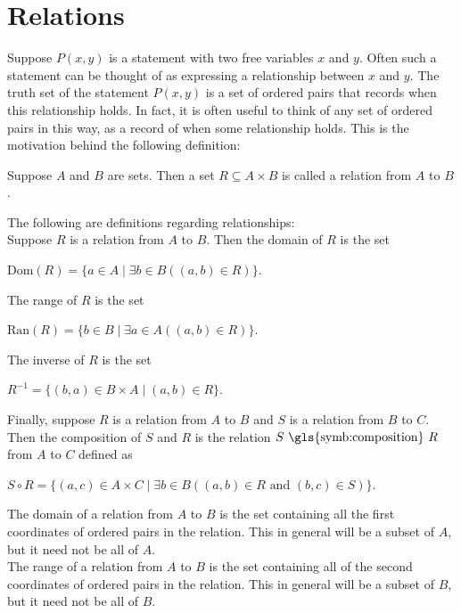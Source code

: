 \documentclass{article}
\begin{document}
\section{Relations}
Suppose $P(x, y)$ is a statement with two free variables $x$ and $y$. Often such a statement can be thought of as expressing a \gls{relationship} between $x$ and $y$. The truth set of the statement $P(x, y)$ is a set of ordered pairs that records when this relationship holds. In fact, it is often useful to think of any set of ordered pairs in this way, as a record of when some relationship holds. This is the motivation behind the following definition:
\begin{center}
    Suppose $A$ and $B$ are sets. Then a set $R \subseteq A \times B$ is called a \gls{relation} from $A$ to $B$.
\end{center}
The following are definitions regarding relationships:\\
Suppose $R$ is a relation from $A$ to $B$. Then the \gls{domain} of $R$ is the set
\begin{center}
    $\text{Dom}(R) = \{a \in A \mid \exists b \in B((a,b) \in R)\}$.
\end{center}
The \gls{range} of $R$ is the set
\begin{center}
    $\text{Ran}(R) = \{b \in B \mid \exists a \in A((a,b) \in R)\}$.
\end{center}
The \gls{inverse} of $R$ is the set
\begin{center}
    $R^{-1} = \{(b,a) \in B \times A \mid (a,b) \in R\}$.
\end{center}
Finally, suppose $R$ is a relation from $A$ to $B$ and $S$ is a relation from $B$ to $C$. Then the \gls{composition} of $S$ and $R$ is the relation $S \text{ \gls{symb:composition} } R$ from $A$ to $C$ defined as
\begin{center}
    $S \circ R = \{(a,c) \in A \times C \mid \exists b \in B((a,b) \in R \text{ and } (b,c) \in S)\}$.
\end{center}

\bigskip
\noindent The domain of a relation from $A$ to $B$ is the set containing all the first coordinates of ordered pairs in the relation. This in general will be a subset of $A$, but it need not be all of $A$.\\

\noindent The range of a relation from $A$ to $B$ is the set containing all of the second coordinates of ordered pairs in the relation. This in general will be a subset of $B$, but it need not be all of $B$.\\
\end{document}
